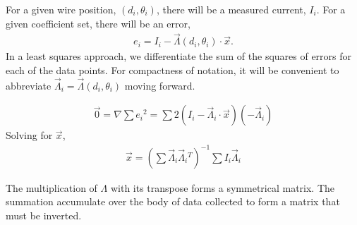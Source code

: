 \documentclass{article}
\begin{document}
For a given wire position, $(d_i, \theta_i)$, there will be a measured current, $I_i$.  For a given coefficient set, there will be an error,
\begin{align}
e_i = I_i - \vec{\Lambda}(d_i, \theta_i) \cdot \vec{x}.
\end{align}
In a least squares approach, we differentiate the sum of the squares of errors for each of the data points.  For compactness of notation, it will be convenient to abbreviate $\vec{\Lambda}_i = \vec{\Lambda}(d_i, \theta_i)$ moving forward.

\begin{align}
\vec{0} = \nabla \sum e_i {^2} = \sum 2(I_i - \vec{\Lambda}_i \cdot \vec{x})(- \vec{\Lambda}_i)
\end{align}
Solving for $\vec{x}$,
\begin{align}
\vec{x} = \left(\sum \vec{\Lambda}_i \vec{\Lambda}_i{^T}\right)^{-1} \sum I_i \vec{\Lambda}_i
\end{align}

The multiplication of $\Lambda$ with its transpose forms a symmetrical matrix.  The summation accumulate over the body of data collected to form a matrix that must be inverted.
\end{document}
